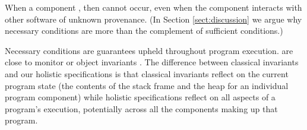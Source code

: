 When a component ,
then  cannot occur, even when the
component interacts with other software of unknown provenance.
(In Section \ref{sect:discussion} we argue why necessary conditions are more than the complement of
sufficient conditions.)

 
Necessary conditions are guarantees upheld throughout program execution.
 are close to monitor or object
invariants \cite{Hoare74,Meyer97}. The difference between 
classical invariants and our holistic specifications is that classical invariants  reflect  on
the current program state (\ie the contents of the
stack frame and the heap for an individual program component) while
holistic specifications reflect on all aspects of a program's
execution, potentially across all the components making up that program.


